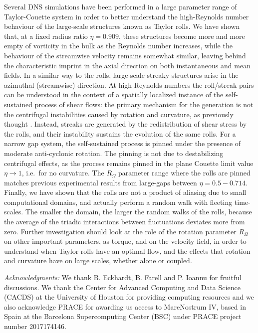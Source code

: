 \documentclass{jfm}
\begin{document}
Several DNS simulations have been performed in a large parameter range of Taylor-Couette system in order to better understand the high-Reynolds number behaviour of the large-scale structures known as Taylor rolls. We have shown that, at a fixed radius ratio $\eta=0.909$, these structures become more and more empty of vorticity in the bulk as the Reynolds number increases, while the behaviour of the streamwise velocity remains somewhat similar, leaving behind the characteristic imprint in the axial direction on both instantaneous and mean fields. In a similar way to the rolls, large-scale streaky structures arise in the azimuthal (streamwise) direction. At high Reynolds numbers the roll/streak pairs can be understood in the context of a spatially localized instance of the self-sustained process of shear flows: the primary mechanism for the generation is not the centrifugal instabilities caused by rotation and curvature, as previously thought \citep{ost16}. Instead, streaks are generated by the redistribution of shear stress by the rolls, and their instability sustains the evolution of the same rolls. For a narrow gap system, the  self-sustained process is pinned under the presence of moderate anti-cyclonic rotation. The pinning is not due to destabilizing centrifugal effects, as the process remains pinned in the plane Couette limit value $\eta \to 1$, i.e.~for no curvature. The $R_\Omega$ parameter range where the rolls are pinned matches previous experimental results from large-gaps between $\eta=0.5-0.714$. Finally, we have shown that the rolls are not a product of aliasing due to small computational domains, and actually perform a random walk with fleeting time-scales. The smaller the domain, the larger the random walks of the rolls, because the average of the triadic interactions between fluctuations deviates more from zero. Further investigation should look at the role of the rotation parameter $R_{\Omega}$ on other important parameters, as torque, and on the velocity field, in order to understand when Taylor rolls have an optimal flow, and the effects that rotation and curvature have on large scales, whether alone or coupled.

\emph{Acknowledgments:} We thank B. Eckhardt, B. Farell and P. Ioannu for fruitful discussions. We thank the Center for Advanced Computing and Data Science (CACDS) at the University of Houston for providing computing resources and we also acknowledge PRACE for awarding us access to MareNostrum IV, based in Spain at the Barcelona Supercomputing Center (BSC) under PRACE project number 2017174146.






\end{document}
